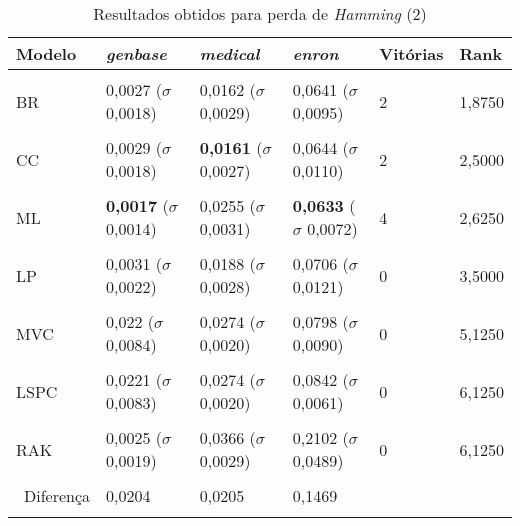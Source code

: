\begin{table}[htbp]
	\centering
	\caption{Resultados obtidos para perda de \textit{{Hamming}} (2)}
		\begin{tabular}
        { p{0.88in} p{0.88in} p{0.88in} p{0.88in} p{0.88in} p{0.88in} }
        
        \hline
Modelo & \textit{genbase} & \textit{medical} & \textit{enron} & \textbf{Vitórias} & \textbf{Rank} \\ 
\hline \\

BR & 0,0027 \newline ($\sigma$ 0,0018) & 0,0162 \newline ($\sigma$ 0,0029) & 0,0641 \newline ($\sigma$ 0,0095) & 2 & 1,8750 \\ \\
CC & 0,0029 \newline ($\sigma$ 0,0018) & \textbf{0,0161} \newline ($\sigma$ 0,0027) & 0,0644 \newline ($\sigma$ 0,0110) & 2 & 2,5000 \\ \\
ML & \textbf{0,0017} \newline ($\sigma$ 0,0014) & 0,0255 \newline ($\sigma$ 0,0031) & \textbf{0,0633} \newline ($\sigma$ 0,0072) & 4 & 2,6250 \\ \\
LP & 0,0031 \newline ($\sigma$ 0,0022) & 0,0188 \newline ($\sigma$ 0,0028) & 0,0706 \newline ($\sigma$ 0,0121) & 0 & 3,5000 \\ \\
MVC & 0,022 \newline ($\sigma$ 0,0084) & 0,0274 \newline ($\sigma$ 0,0020) & 0,0798 \newline ($\sigma$ 0,0090) & 0 & 5,1250 \\ \\
LSPC & 0,0221 \newline ($\sigma$ 0,0083) & 0,0274 \newline ($\sigma$ 0,0020) & 0,0842 \newline ($\sigma$ 0,0061) & 0 & 6,1250 \\ \\
RAK & 0,0025 \newline ($\sigma$ 0,0019) & 0,0366 \newline ($\sigma$ 0,0029) & 0,2102 \newline ($\sigma$ 0,0489) & 0 & 6,1250 \\ \\

\hline \ 
 Diferença & 0,0204 & 0,0205 & 0,1469 &  &  \\ 
\hline \\

        \end{tabular}
	\label{tab:metricsForHammingLoss_2}
\end{table}
